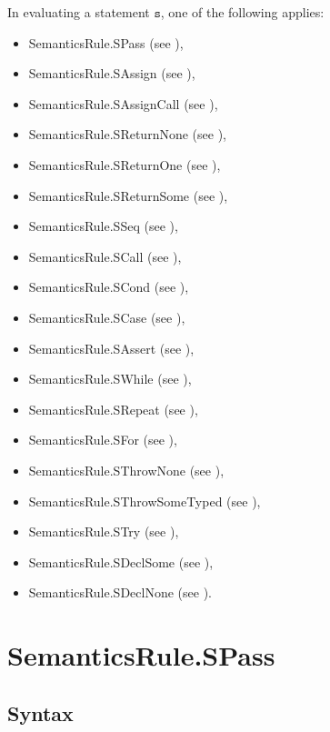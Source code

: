 \documentclass{book}
\newcommand\vs[0]{\texttt{s}}
\begin{document}
In evaluating a statement $\vs$, one of the following applies:
\begin{itemize}
\item SemanticsRule.SPass (see ),
\item SemanticsRule.SAssign (see ),
\item SemanticsRule.SAssignCall (see ),
\item SemanticsRule.SReturnNone (see ),
\item SemanticsRule.SReturnOne (see ),
\item SemanticsRule.SReturnSome (see ),
\item SemanticsRule.SSeq (see ),
\item SemanticsRule.SCall (see ),
\item SemanticsRule.SCond (see ),
\item SemanticsRule.SCase (see ),
\item SemanticsRule.SAssert (see ),
\item SemanticsRule.SWhile (see ),
\item SemanticsRule.SRepeat (see ),
\item SemanticsRule.SFor (see ),
\item SemanticsRule.SThrowNone (see ),
\item SemanticsRule.SThrowSomeTyped (see ),
\item SemanticsRule.STry (see ),
\item SemanticsRule.SDeclSome (see ),
\item SemanticsRule.SDeclNone (see ).
\end{itemize}

\section{SemanticsRule.SPass \label{sec:SemanticsRule.SPass}}
\subsection{Syntax}
\end{document}
